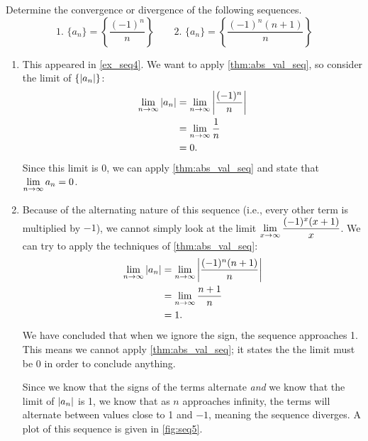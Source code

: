 \begin{example}\label{ex_seq5}%
Determine the convergence or divergence of the following sequences.
\[
 \text{1. }\{a_n\} = \left\{\frac{(-1)^n}{n}\right\}\qquad
 \text{2. }\{a_n\} = \left\{\frac{(-1)^n(n+1)}{n}\right\}
\]
\solution
\begin{enumerate}
\item		This appeared in \autoref{ex_seq4}. We want to apply \autoref{thm:abs_val_seq}, so consider the limit of $\{\left\lvert a_n \right\rvert\}$:
\begin{align*}
\lim_{n\to\infty}\left\lvert a_n \right\rvert&= \lim_{n\to\infty} \left\lvert \frac{(-1)^n}{n} \right\rvert \\
					&= \lim_{n\to\infty} \frac1n \\
					&= 0.
\end{align*}
Since this limit is 0, we can apply \autoref{thm:abs_val_seq} and state that $\displaystyle\lim_{n\to\infty} a_n=0$.

\item Because of the alternating nature of this sequence (i.e., every other term is multiplied by $-1$), we cannot simply look at the limit $\displaystyle \lim_{x\to\infty} \frac{(-1)^x(x+1)}{x}$. We can try to apply the techniques of \autoref{thm:abs_val_seq}:
\begin{align*}
	\lim_{n\to\infty}\left\lvert a_n \right\rvert
	&= \lim_{n\to\infty} \left\lvert \frac{(-1)^n(n+1)}{n} \right\rvert \\
	&= \lim_{n\to\infty} \frac{n+1}{n}\\
	&= 1.
\end{align*}
%
%
%
We have concluded that when we ignore the sign, the sequence approaches 1. This means we cannot apply \autoref{thm:abs_val_seq}; it states the the limit must be 0 in order to conclude anything.

Since we know that the signs of the terms alternate \emph{and} we know that the limit of $\left\lvert a_n \right\rvert$ is 1, we know that as $n$ approaches infinity, the terms will alternate between values close to 1 and $-1$, meaning the sequence diverges. A plot of this sequence is given in \autoref{fig:seq5}.
\end{enumerate}
\end{example}

